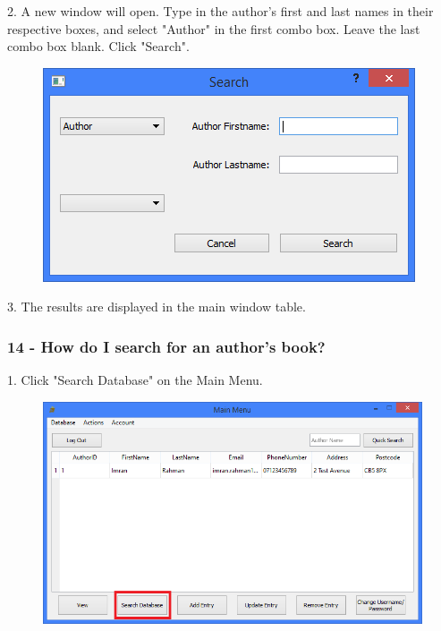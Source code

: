 2. A new window will open. Type in the author's first and last names in their respective boxes, and select "Author" in the first combo box. Leave the last combo box blank. Click "Search".

\begin{figure}[H]
    \includegraphics[width=\textwidth]{./Manual/Tutorial/Q13/SearchDatabaseWindow.png}
\end{figure}

3. The results are displayed in the main window table.

\subsubsection{14 - How do I search for an author's book?} \label{sssec:Q14}

1. Click "Search Database" on the Main Menu.

\begin{figure}[H]
    \includegraphics[width=\textwidth]{./Manual/Tutorial/Q13/SearchDatabase.png}
\end{figure}

